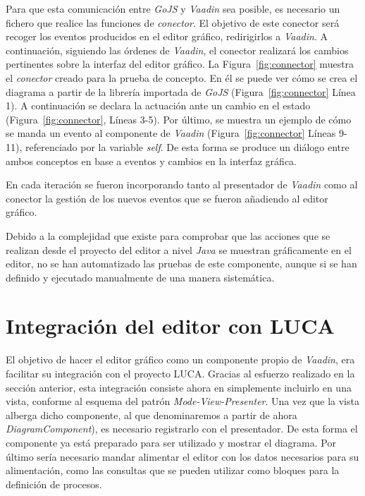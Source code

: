 Para que esta comunicación entre \emph{GoJS} y \emph{Vaadin} sea posible, es necesario un fichero que realice las funciones de \emph{conector}. El objetivo de este conector será recoger los eventos producidos en el editor gráfico, redirigirlos a \emph{Vaadin}. A continuación, siguiendo las órdenes de \emph{Vaadin}, el conector realizará los cambios pertinentes sobre la interfaz del editor gráfico. La Figura~\ref{fig:connector} muestra el \emph{conector} creado para la prueba de concepto. En él se puede ver cómo se crea el diagrama a partir de la librería importada de \emph{GoJS} (Figura~\ref{fig:connector} Línea 1). A continuación se declara la actuación ante un cambio en el estado (Figura~\ref{fig:connector}, Líneas 3-5). Por último, se muestra un ejemplo de cómo se manda un evento al componente de \emph{Vaadin} (Figura~\ref{fig:connector} Líneas 9-11), referenciado por la variable \emph{self}. De esta forma se produce un diálogo entre ambos conceptos en base a eventos y cambios en la interfaz gráfica.


En cada iteración se fueron incorporando tanto al presentador de \emph{Vaadin} como al conector la gestión de los nuevos eventos que se fueron añadiendo al editor gráfico.

Debido a la complejidad que existe para comprobar que las acciones que se realizan desde el proyecto del editor a nivel \emph{Java} se muestran gráficamente en el editor, no se han automatizado las pruebas de este componente, aunque si se han definido y ejecutado manualmente de una manera sistemática. 

\section{Integración del editor con LUCA}

El objetivo de hacer el editor gráfico como un componente propio de \emph{Vaadin}, era facilitar su integración con el proyecto LUCA. Gracias al esfuerzo realizado en la sección anterior, esta integración consiste ahora en simplemente incluirlo en una vista, conforme al esquema del patrón \emph{Mode-View-Presenter}. Una vez que la vista alberga dicho componente, al que denominaremos a partir de ahora  \emph{DiagramComponent}), es necesario registrarlo con el presentador. De esta forma el componente ya está preparado para ser utilizado y mostrar el diagrama. Por último sería necesario mandar alimentar el editor con los datos necesarios para su alimentación, como las consultas que se pueden utilizar como bloques para la definición de procesos.

